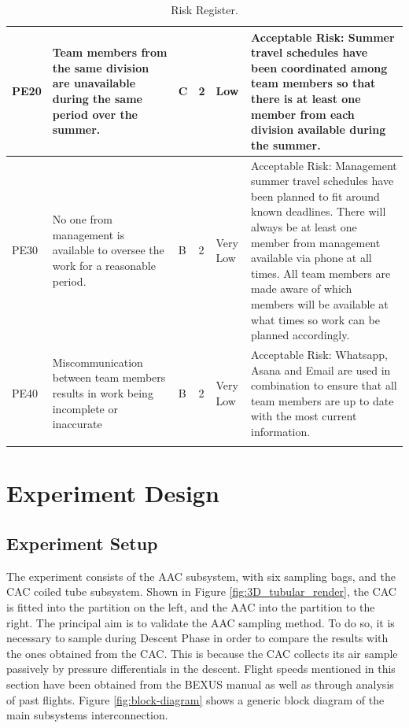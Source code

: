 \documentclass[a4paper,12pt,twoside]{article}
\begin{document}
\begin{landscape}
\begin{longtable}{|m{}| m{} |m{} |m{}|m{}| m{}|}
PE20 & Team members from the same division are unavailable during the same period over the summer. & C & 2 & \cellcolor[HTML]{FCFF2F}Low & Acceptable Risk: Summer travel schedules have been coordinated among team members so that there is at least one member from each division available during the summer. \\ \hline
PE30 & No one from management is available to oversee the work for a reasonable period. & B & 2 & \cellcolor[HTML]{34FF34}Very Low & Acceptable Risk: Management summer travel schedules have been planned to fit around known deadlines. There will always be at least one member from management available via phone at all times. All team members are made aware of which members will be available at what times so work can be planned accordingly. \\ \hline
PE40 & Miscommunication between team members results in work being incomplete or inaccurate & B & 2 & \cellcolor[HTML]{34FF34}Very Low & Acceptable Risk: Whatsapp, Asana and Email are used in combination to ensure that all team members are up to date with the most current information. \\ \hline

\caption{Risk Register.}
\label{tab:risk-register}
\end{longtable}
\raggedbottom
\end{landscape}

\pagebreak
\section{Experiment Design}
\subsection{Experiment Setup} \label{Experiment_Setup}

The experiment consists of the AAC subsystem, with six sampling bags, and the CAC coiled tube subsystem. Shown in Figure {\ref{fig:3D_tubular_render}}, the CAC is fitted into the partition on the left, and the AAC into the partition to the right. The principal aim is to validate the AAC sampling method. To do so, it is necessary to sample during Descent Phase in order to compare the results with the ones obtained from the CAC. This is because the CAC collects its air sample passively by pressure differentials in the descent. Flight speeds mentioned in this section have been obtained from the BEXUS manual as well as through analysis of past flights. Figure \ref{fig:block-diagram} shows a generic block diagram of the main subsystems interconnection.
\end{document}
